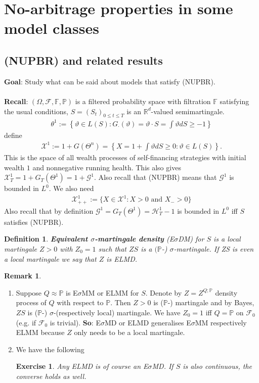 \documentclass[12pt,a4paper, twoside]{article}
\newtheorem{defn}{Definition}[section]
\newtheorem{exe}{Exercise}[section]
\theoremstyle{definition}
\newtheorem{rem}{Remark}[section]
\newcommand{\PP}{\mathbb{P}} %
\begin{document}
\section{No-arbitrage properties in some model classes}
\subsection{(NUPBR) and related results}
\textbf{Goal}: Study what can be said about models that satisfy (NUPBR).
\\\\
\textbf{Recall}: $( \Omega, \mathcal{F}, \mathbb{F}, \PP)$ is a filtered probability space with filtration $\mathbb{F}$ satisfying the usual conditions, $S=(S_t)_{0 \leq t \leq T}$ is an $\mathbb{R}^d$-valued semimartingale. 
\begin{align*}
\theta^1:= \left\{ \vartheta \in L(S): G_\cdot ( \vartheta) = \vartheta \cdot S = \int \vartheta dS \geq -1 \right\}
\end{align*}
define
\begin{align*}
\mathcal{X}^1 := 1 + G( \Theta^n) = \left\{ X = 1 + \int \vartheta dS \geq 0 : \vartheta \in L(S) \right\}. 
\end{align*}
This is the space of all wealth processes of self-financing strategies with initial wealth $1$ and nonnegative running health. This also gives $\mathcal{X}_T^1 = 1 + G_T( \Theta^1) = 1 + \mathcal{G}^1$. Also recall that (NUPBR) means that $\mathcal{G}^1$ is bounded in $L^0$. We also need 
\begin{align*}
\mathcal{X}_{++}^1:= \{ X \in \mathcal{X}^1 : X >0 \text{ and } X_- >0 \}
\end{align*}
Also recall that by definition $\mathcal{G}^1= G_T( \Theta^1) = \mathcal{H}_T^1-1$ is bounded in $L^0$ iff $S$ satisfies (NUPBR). 
\begin{defn} \textbf{Equivalent $\sigma$-martingale density} (E$\sigma$DM) for $S$ is a local martingale $Z >0$ with $Z_0 = 1$ such that $ZS$ is a $(\PP$-) $\sigma$-martingale. If ZS is even a local martingale we say that $Z$ is ELMD. 
\end{defn}
\begin{rem} \
\begin{enumerate}
\item Suppose $Q \approx \PP$ is E$\sigma$MM or ELMM for $S$. Denote by $Z = Z^{Q; \PP}$ density process of $Q$ with respect to $\PP$. Then $Z >0$ is ($\PP$-) martingale and by Bayes, $ZS$ is ($\PP$-) $\sigma$-(respectively local) martingale. We have $Z_0=1$ iff $Q= \PP$ on $\mathcal{F}_0$ (e.g. if $\mathcal{F}_0$ is trivial). 
\textbf{So}: E$\sigma$MD or ELMD generalises E$\sigma$MM respectively ELMM because $Z$ only needs to be a local martingale. 
\item We have the following
\begin{exe} Any ELMD is of course an E$\sigma$MD. If $S$ is also continuous, the converse holds as well. 
\end{exe}
\end{enumerate}
\end{rem}
\end{document}
